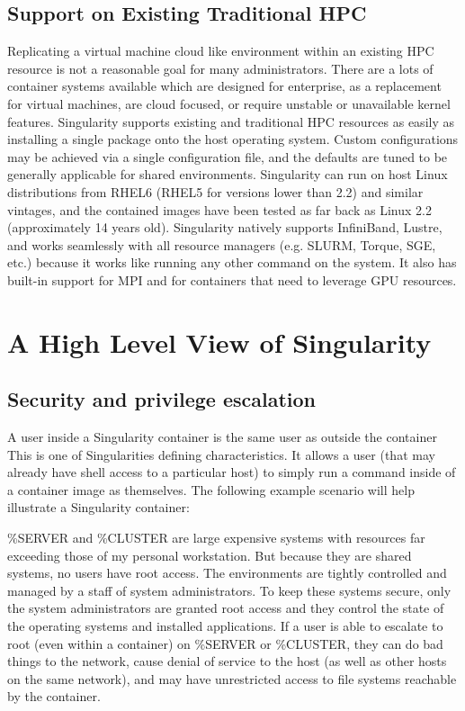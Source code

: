 \documentclass[letterpaper,10pt,english]{sphinxmanual}
\begin{document}
\subsection{Support on Existing Traditional HPC}
\label{\detokenize{introduction:support-on-existing-traditional-hpc}}
Replicating a virtual machine cloud like environment within an
existing HPC resource is not a reasonable goal for many
administrators. There are a lots of container systems available which
are designed for enterprise, as a replacement for virtual machines,
are cloud focused, or require unstable or unavailable kernel features.
Singularity supports existing and traditional HPC resources as easily
as installing a single package onto the host operating system. Custom
configurations may be achieved via a single configuration file, and
the defaults are tuned to be generally applicable for shared
environments.
Singularity can run on host Linux distributions from RHEL6 (RHEL5 for
versions lower than 2.2) and similar vintages, and the contained
images have been tested as far back as Linux 2.2 (approximately 14
years old). Singularity natively supports InfiniBand, Lustre, and
works seamlessly with all resource managers (e.g. SLURM, Torque, SGE,
etc.) because it works like running any other command on the system.
It also has built-in support for MPI and for containers that need to
leverage GPU resources.


\section{A High Level View of Singularity}
\label{\detokenize{introduction:a-high-level-view-of-singularity}}

\subsection{Security and privilege escalation}
\label{\detokenize{introduction:security-and-privilege-escalation}}\label{\detokenize{introduction:id1}}
A user inside a Singularity container
is the same user as outside the container
This is one of Singularities defining characteristics. It allows a
user (that may already have shell access to a particular host) to
simply run a command inside of a container image as themselves. The following example
scenario will help illustrate a Singularity container:

\%SERVER and \%CLUSTER are large expensive systems with resources far
exceeding those of my personal workstation. But because they are
shared systems, no users have root access. The environments are
tightly controlled and managed by a staff of system administrators.
To keep these systems secure, only the system administrators are
granted root access and they control the state of the operating
systems and installed applications. If a user is able to escalate to
root (even within a container) on \%SERVER or \%CLUSTER, they can do
bad things to the network, cause denial of service to the host (as
well as other hosts on the same network), and may have unrestricted
access to file systems reachable by the container.
\end{document}
